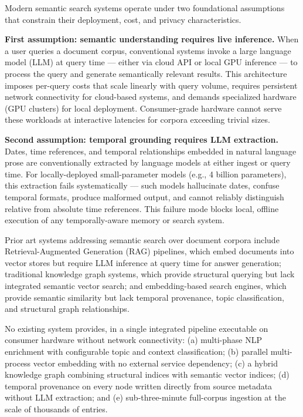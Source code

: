 \documentclass[12pt,letterpaper]{article}
\begin{document}
Modern semantic search systems operate under two foundational assumptions that constrain
their deployment, cost, and privacy characteristics.

\textbf{First assumption: semantic understanding requires live inference.} When a user
queries a document corpus, conventional systems invoke a large language model (LLM) at
query time --- either via cloud API or local GPU inference --- to process the query and
generate semantically relevant results. This architecture imposes per-query costs that
scale linearly with query volume, requires persistent network connectivity for
cloud-based systems, and demands specialized hardware (GPU clusters) for local
deployment. Consumer-grade hardware cannot serve these workloads at interactive
latencies for corpora exceeding trivial sizes.

\textbf{Second assumption: temporal grounding requires LLM extraction.} Dates, time
references, and temporal relationships embedded in natural language prose are
conventionally extracted by language models at either ingest or query time. For
locally-deployed small-parameter models (e.g., 4 billion parameters), this extraction
fails systematically --- such models hallucinate dates, confuse temporal formats,
produce malformed output, and cannot reliably distinguish relative from absolute time
references. This failure mode blocks local, offline execution of any temporally-aware
memory or search system.

Prior art systems addressing semantic search over document corpora include
Retrieval-Augmented Generation (RAG) pipelines, which embed documents into vector
stores but require LLM inference at query time for answer generation; traditional
knowledge graph systems, which provide structural querying but lack integrated semantic
vector search; and embedding-based search engines, which provide semantic similarity
but lack temporal provenance, topic classification, and structural graph relationships.

No existing system provides, in a single integrated pipeline executable on consumer
hardware without network connectivity: (a) multi-phase NLP enrichment with configurable
topic and context classification; (b) parallel multi-process vector embedding with no
external service dependency; (c) a hybrid knowledge graph combining structural indices
with semantic vector indices; (d) temporal provenance on every node written directly
from source metadata without LLM extraction; and (e) sub-three-minute full-corpus
ingestion at the scale of thousands of entries.
\end{document}
